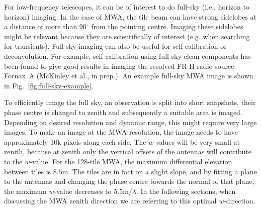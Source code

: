 \documentclass[useAMS,usenatbib]{mn2e}
\newcommand{\degree}{\ensuremath{^{\circ}}\xspace}
\begin{document}
For low-frequency telescopes, it can be of interest to do full-sky (i.e., horizon to horizon) imaging. In the case of MWA, the tile beam can have strong sidelobes at a distance of more than 90\degree from the pointing centre. Imaging these sidelobes might be relevant because they are scientifically of interest (e.g. when searching for transients). Full-sky imaging can also be useful for self-calibration or deconvolution. For example, self-calibration using full-sky clean components has been found to give good results in imaging the resolved FR-II radio source Fornax~A (McKinley et al., in prep.). An example full-sky MWA image is shown in Fig.~\ref{fig:full-sky-example}.

To efficiently image the full sky, an observation is split into short snapshots, their phase centre is changed to zenith and subsequently a suitable area is imaged. Depending on desired resolution and dynamic range, this might require very large images. To make an image at the MWA resolution, the image needs to have approximately 10k pixels along each side. The $w$-values will be very small at zenith, because at zenith only the vertical offsets of the antennas will contribute to the $w$-value. For the 128-tile MWA, the maximum differential elevation between tiles is $8.5$m. The tiles are in fact on a slight slope, and by fitting a plane to the antennas and changing the phase centre towards the normal of that plane, the maximum $w$-value decreases to $5.5\textrm{m} / \lambda$. In the following sections, when discussing the MWA zenith direction we are referring to this optimal $w$-direction.
\end{document}
